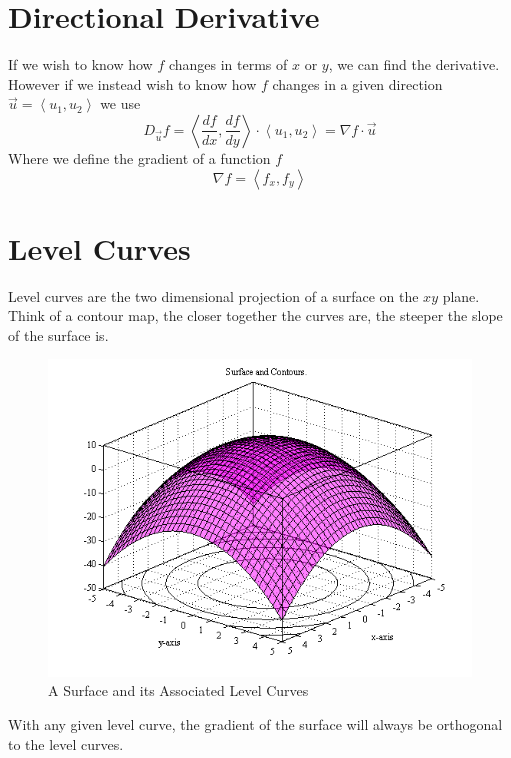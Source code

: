\documentclass{article}
\newcommand{\nvec}[1]{\left\langle #1 \right\rangle}
\begin{document}
\section{Directional Derivative}
If we wish to know how $f$ changes in terms of $x$ or $y$, we can find the derivative. However if we instead wish to know how $f$ changes in a given direction $\vec{u} = \nvec{u_1, u_2}$ we use
\begin{equation}
D_{\vec{u} }f = \nvec{\frac{df}{dx}, \frac{df}{dy} } \cdot \nvec{u_1, u_2} = \nabla f \cdot \vec{u}
\end{equation}
Where we define the gradient of a function $f$
\begin{equation}
\nabla f = \nvec{f_x, f_y}
\end{equation}
\section{Level Curves}
Level curves are the two dimensional projection of a surface on the $xy$ plane. Think of a contour map, the closer together the curves are, the steeper the slope of the surface is.
\begin{figure}[h]
\centering
    \includegraphics[scale=0.5]{levelcurve.png}
    \caption{A Surface and its Associated Level Curves}
\end{figure}
With any given level curve, the gradient of the surface will always be orthogonal to the level curves.
\end{document}
